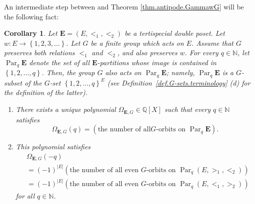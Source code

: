 \documentclass[12pt]{article}
\theoremstyle{plain}
\newtheorem{corollary}[theorem]{Corollary}
\theoremstyle{definition}
\theoremstyle{remark}
\newcommand{\Par}{\operatorname{Par}}
\newcommand{\EE}{{\mathbf{E}}}
\newcommand{\NN}{{\mathbb{N}}}
\begin{document}
An intermediate step between \cite[Theorem 2.13]{Joch} and Theorem
\ref{thm.antipode.GammawG} will be the following fact:

\begin{corollary}
\label{cor.reciprocity.GammawG}Let $ \EE =\left(  E,<_{1},<_{2}\right)
$ be a tertispecial double poset. Let $w:E\rightarrow\left\{  1,2,3,\ldots
\right\}  $. Let $G$ be a finite group which acts on $E$. Assume that $G$
preserves both relations $<_{1}$ and $<_{2}$, and also preserves $w$. For
every $q\in \NN $, let $\Par_q \EE$
denote the set of all $\EE$-partitions whose image is contained in
$\left\{  1,2,\ldots,q\right\}  $. Then, the group $G$ also acts on
$\Par_q \EE$; namely,
$\Par_q \EE$ is a $G$-subset of the $G$-set $\left\{  1,2,\ldots
,q\right\}  ^{E}$ (see Definition~\ref{def.G-sets.terminology} (d) for the
definition of the latter).

\begin{enumerate}
\item[(a)] There exists a unique polynomial $\Omega_{\EE, G}
\in\mathbb{Q}\left[  X\right]  $ such that every $q\in \NN $ satisfies%
\begin{equation}
\Omega_{\EE, G}\left(  q\right)  =\left(  \text{the number of all
}G\text{-orbits on } \Par_q \EE \right)  .
\label{eq.cor.reciprocity.GammawG.a.def}
\end{equation}


\item[(b)] This polynomial satisfies%
\begin{align}
&  \Omega_{\EE,G}\left(  -q\right) \nonumber\\
&  =\left(  -1\right)  ^{\left\vert E\right\vert }\left(  \text{the number of
all even }G\text{-orbits on } \Par_q \left(
E,>_{1},<_{2}\right)  \right) \nonumber\\
&  =\left(  -1\right)  ^{\left\vert E\right\vert }\left(  \text{the number of
all even }G\text{-orbits on } \Par_q \left(
E,<_{1},>_{2}\right)  \right)
\label{eq.cor.reciprocity.GammawG.b.2}
\end{align}
for all $q\in \NN $.
\end{enumerate}
\end{corollary}
\end{document}
